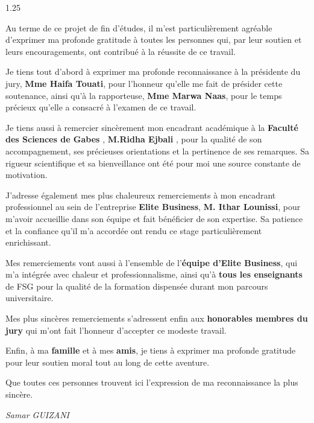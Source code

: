 \documentclass[12pt, oneside, a4paper]{report}
\begin{document}
\begin{spacing}{1.25} %

Au terme de ce projet de fin d'études, il m'est particulièrement agréable d'exprimer ma profonde gratitude à toutes les personnes qui, par leur soutien et leurs encouragements, ont contribué à la réussite de ce travail.

Je tiens tout d'abord  à exprimer ma profonde reconnaissance à la présidente du jury, \textbf{Mme Haifa Touati}, pour l'honneur qu'elle me fait de présider cette soutenance, ainsi qu'à la rapporteuse, \textbf{Mme Marwa Naas}, pour le temps précieux qu'elle a consacré à l'examen de ce travail.

Je tiens aussi  à remercier sincèrement mon encadrant académique à la \textbf{Faculté des Sciences de Gabes }, \textbf{M.Ridha Ejbali }, pour la qualité de son accompagnement, ses précieuses orientations et la pertinence de ses remarques. Sa rigueur scientifique et sa bienveillance ont été pour moi une source constante de motivation.

J'adresse également mes plus chaleureux remerciements à mon encadrant professionnel au sein de l'entreprise \textbf{Elite Business}, \textbf{M. Ithar Lounissi}, pour m'avoir accueillie dans son équipe et fait bénéficier de son expertise. Sa patience et la confiance qu'il m'a accordée ont rendu ce stage particulièrement enrichissant.

Mes remerciements vont aussi à l'ensemble de l'\textbf{équipe d'Elite Business}, qui m'a intégrée avec chaleur et professionnalisme, ainsi qu'à \textbf{tous les enseignants} de FSG pour la qualité de la formation dispensée durant mon parcours universitaire.

Mes plus sincères remerciements s'adressent enfin aux \textbf{honorables membres du jury} qui m'ont fait l'honneur d'accepter  ce modeste travail.

Enfin, à ma \textbf{famille} et à mes \textbf{amis}, je tiens à exprimer ma profonde gratitude pour leur soutien moral tout au long de cette aventure.

Que toutes ces personnes trouvent ici l'expression de ma reconnaissance la plus sincère.

\end{spacing}

\vspace{1.5cm}

\begin{flushright}
\textit{Samar GUIZANI}
\end{flushright}
\end{document}

